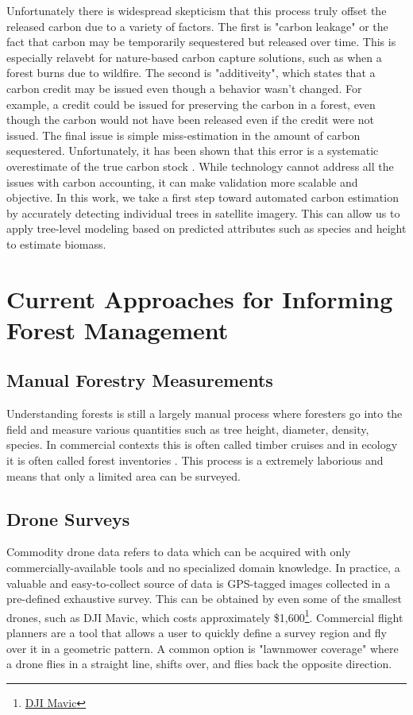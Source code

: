 Unfortunately there is widespread skepticism that this process truly offset the released carbon due to a variety of factors. The first is "carbon leakage" or the fact that carbon may be temporarily sequestered but released over time. This is especially relavebt for nature-based carbon capture solutions, such as when a forest burns due to wildfire. The second is "additiveity", which states that a carbon credit may be issued even though a behavior wasn't changed. For example, a credit could be issued for preserving the carbon in a forest, even though the carbon would not have been released even if the credit were not issued. The final issue is simple miss-estimation in the amount of carbon sequestered. Unfortunately, it has been shown that this error is a systematic overestimate of the true carbon stock \cite{Badgley2022SystematicProgram,West2020OverstatedAmazon}. While technology cannot address all the issues with carbon accounting, it can make validation more scalable and objective. In this work, we take a first step toward automated carbon estimation by accurately detecting individual trees in satellite imagery. This can allow us to apply tree-level modeling based on predicted attributes such as species and height to estimate biomass.    


\section{Current Approaches for Informing Forest Management}
\subsection{Manual Forestry Measurements}
Understanding forests is still a largely manual process where foresters go into the field and measure various quantities such as tree height, diameter, density, species. In commercial contexts this is often called timber cruises \cite{ServiceFSHHANDBOOK} and in ecology it is often called forest inventories \cite{USForestServiceDepartmentofAgriculture2016FORESTPLOTS}. This process is a extremely laborious and means that only a limited area can be surveyed.

\subsection{Drone Surveys}
Commodity drone data refers to data which can be acquired with only commercially-available tools and no specialized domain knowledge. In practice, a valuable and easy-to-collect source of data is GPS-tagged images collected in a pre-defined exhaustive survey. This can be obtained by even some of the smallest drones, such as DJI Mavic, which costs approximately \$1,600\footnote{\href{https://store.dji.com/product/dji-mavic-3-classic}{DJI Mavic}}. Commercial flight planners are a tool that allows a user to quickly define a survey region and fly over it in a geometric pattern. A common option is "lawnmower coverage" where a drone flies in a straight line, shifts over, and flies back the opposite direction. 


